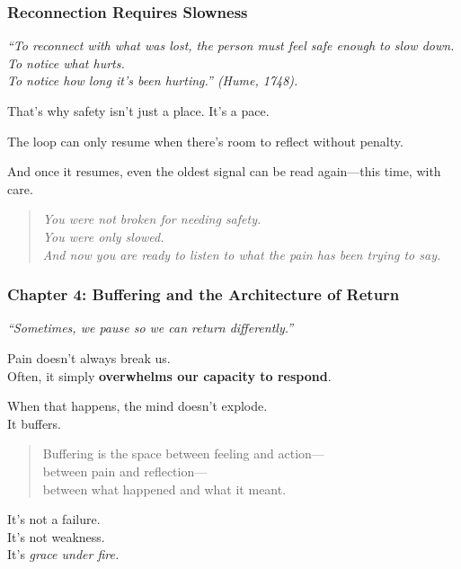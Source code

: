 \subsubsection{\texorpdfstring{\textbf{Reconnection Requires
Slowness}}{Reconnection Requires Slowness}}\label{reconnection-requires-slowness}

\emph{``To reconnect with what was lost, the person must feel safe
enough to slow down.\\
To notice what hurts.\\
To notice how long it's been hurting.'' (Hume, 1748).}

That's why safety isn't just a place. It's a pace.

The loop can only resume when there's room to reflect without penalty.

And once it resumes, even the oldest signal can be read again---this
time, with care.

\begin{quote}
\emph{You were not broken for needing safety.\\
You were only slowed.\\
And now you are ready to listen to what the pain has been trying to
say.}
\end{quote}

\subsubsection{\texorpdfstring{\textbf{Chapter 4: Buffering and the
Architecture of
Return}}{Chapter 4: Buffering and the Architecture of Return}}\label{chapter-4-buffering-and-the-architecture-of-return}

\emph{``Sometimes, we pause so we can return differently.''}

Pain doesn't always break us.\\
Often, it simply \textbf{overwhelms our capacity to respond}.

When that happens, the mind doesn't explode.\\
It buffers.

\begin{quote}
Buffering is the space between feeling and action---\\
between pain and reflection---\\
between what happened and what it meant.
\end{quote}

It's not a failure.\\
It's not weakness.\\
It's \emph{grace under fire.}

